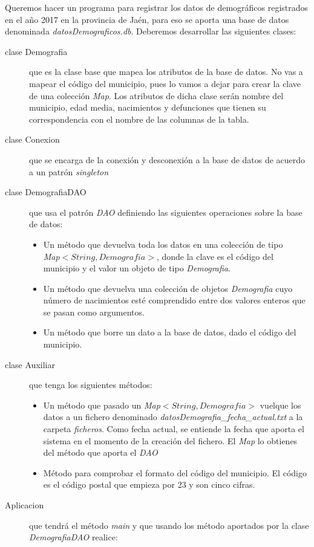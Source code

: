 \documentclass[addpoints,12pt]{exam}
\begin{document}
\begin{questions}
\question Queremos hacer un programa para registrar los datos de demográficos registrados en el año 2017 en la provincia de Jaén, para eso se aporta una base de datos denominada \emph{datosDemograficos.db}. Deberemos desarrollar las siguientes clases:
\begin{description}
\item[clase Demografia] que es la clase base que mapea los atributos de la base de datos. No vas a mapear el código del municipio, pues lo vamos a dejar para crear la clave de una colección \emph{Map}. Los atributos de dicha clase serán nombre del municipio, edad media, nacimientos y defunciones que tienen su correspondencia con el nombre de las columnas de la tabla.
\item[clase Conexion] que se encarga de la conexión y desconexión a la base de datos de acuerdo a un patrón \emph{singleton}
\item[clase DemografiaDAO] que usa el patrón \emph{DAO} definiendo las siguientes operaciones sobre la base de datos:
\begin{itemize}
\item Un método que devuelva toda los datos en una colección de tipo \\\emph{Map$<String,Demografia>$}, donde la clave es el código del municipio y el valor un objeto de tipo \emph{Demografia}.
\item Un método que devuelva una colección de objetos \emph{Demografia} cuyo número de nacimientos esté comprendido entre dos valores enteros que se pasan como argumentos.
\item Un método que borre un dato a la base de datos, dado el código del municipio.
\end{itemize}
\item[clase Auxiliar] que tenga los siguientes métodos:
\begin{itemize}
\item Un método que pasado un \emph{Map$<String,Demografia>$} vuelque los datos a un fichero denominado \emph{datosDemografia\_fecha\_actual.txt} a la carpeta \emph{ficheros}. Como fecha actual, se entiende la fecha que aporta el sistema en el momento de la creación del fichero.
El \emph{Map} lo obtienes del método que aporta el \emph{DAO}
\item Método para comprobar el formato del código del municipio. El código es el código postal que empieza por 23 y son cinco cifras.
\end{itemize}
\item[Aplicacion] que tendrá el método \emph{main} y que usando los método aportados por la clase  \emph{DemografiaDAO} realice:

\end{description}
\end{questions}
\end{document}

